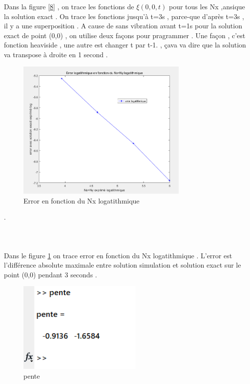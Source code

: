 \documentclass[a4paper,10pt]{report} %
\begin{document}
Dans la figure \ref{8} , on trace les fonctions de $\xi(0,0,t)$ pour tous les Nx ,ansique la solution exact . On trace les fonctions jusqu'à t=3s , parce-que d'après t=3s , il y a une superposition . A cause de sans vibration avant t=1s pour la solution exact de point (0,0) , on utilise deux façons pour pragrammer . Une façon , c'est fonction heaviside , une autre est changer t par t-1. , çava va dire que la solution va transpose à droite en 1 second . 

\begin{figure}[h]
\centering
\includegraphics[width=0.75\textwidth]{fig/figure7.png}
\caption{Error en fonction du Nx logatithmique}
\end{figure}.\\\\\\\\
Dans le figure \ref{9} on trace error en fonction du Nx logatithmique . L'error est l'différence absolute maximale  entre solution simulation et solution exact sur le point (0,0) pendant 3 seconds .
\begin{figure}[h]
\centering
\includegraphics[width=0.54\textwidth]{fig/figure9.png}
\caption{pente}
\label{9}
\end{figure}
\end{document}
